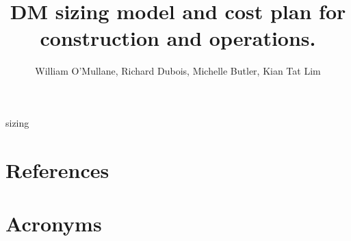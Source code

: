 \documentclass[DM,authoryear,toc]{lsstdoc}
\title{
DM sizing model and cost  plan for construction and operations.}
\author{%
William O'Mullane, Richard Dubois, Michelle Butler, Kian Tat Lim
}
\date{\vcsDate}
\begin{document}
\mkshorttitle



 {sizing}
\appendix
\section{References} \label{sec:bib}


\section{Acronyms} \label{sec:acronyms}

\end{document}

